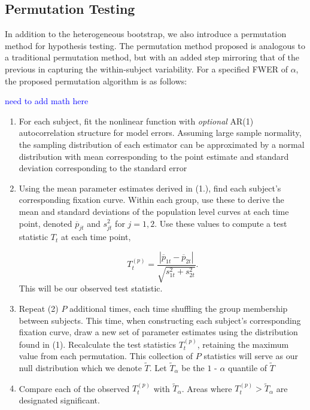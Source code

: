 \documentclass{article}
\providecommand{\cn}[1]{\textcolor{blue}{#1}}
\begin{document}
\subsection{Permutation Testing}

In addition to the heterogeneous bootstrap, we also introduce a permutation method for hypothesis testing. The permutation method proposed is analogous to a traditional permutation method, but with an added step mirroring that of the previous in capturing the within-subject variability. For a specified FWER of $\alpha$, the proposed permutation algorithm is as follows:

\cn{need to add math here}

\begin{enumerate}
\vspace{-2mm}
\item For each subject, fit the nonlinear function with \textit{optional} AR(1) autocorrelation structure for model errors. Assuming large sample normality, the sampling distribution of each estimator can be approximated by a normal distribution with mean corresponding to the point estimate and standard deviation corresponding to the standard error
\item Using the mean parameter estimates derived in (1.), find each subject's corresponding fixation curve. Within each group, use these to derive the mean and standard deviations of the population level curves at each time point, denoted $\overline{p}_{jt}$ and $s_{jt}^2$ for $j = 1,2$. Use these values to compute a test statistic $T_t$ at each time point,

\begin{equation}
T_t^{(p)} = \frac{|\overline{p}_{1t} - \overline{p}_{2t}|}{\sqrt{s_{1t}^2 + s_{2t}^2}}.
\end{equation}
This will be our observed test statistic.
\item Repeat (2) $P$  additional times, each time shuffling the group membership between subjects. This time, when constructing each subject's corresponding fixation curve, draw a new set of parameter estimates using the distribution found in (1). Recalculate the test statistics $T_t^{(p)}$, retaining the maximum value from each permutation. This collection of $P$ statistics will serve as our null distribution which we denote $\widetilde{T}$. Let $\widetilde{T}_{\alpha}$ be the $1$ - $\alpha$ quantile of $\widetilde{T}$
\item Compare each of the observed $T_t^{(p)}$ with $\widetilde{T}_{\alpha}$. Areas where $T_t^{(p)} > \widetilde{T}_{\alpha}$ are designated significant. 
\end{enumerate}
\end{document}

